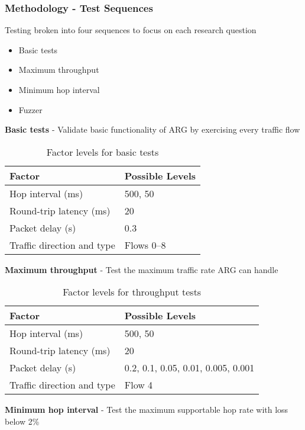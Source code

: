 \documentclass{beamer}
\begin{document}
\begin{frame}
	\frametitle{Methodology - Test Sequences}
	
	\begin{overprint}
		Testing broken into four sequences to focus on each research question
	
		\begin{itemize}
		\item Basic tests
		\item Maximum throughput
		\item Minimum hop interval
		\item Fuzzer
		\end{itemize}
	
		\textbf{Basic tests} - Validate basic functionality of ARG by exercising every traffic flow

		\begin{table}
		\caption{Factor levels for basic tests}
		\label{tbl:basic_factors}
		\centering
		\begin{tabular}{ll}
		\toprule
		\textbf{Factor} & \textbf{Possible Levels} \\
		\hline
		Hop interval (ms) & 500, 50\\
		Round-trip latency (ms) & 20\\
		Packet delay (s) & 0.3\\
		Traffic direction and type & Flows 0--8\\
		\bottomrule
		\end{tabular}
		\end{table}

		\textbf{Maximum throughput} - Test the maximum traffic rate ARG can handle

		\begin{table}
		\caption{Factor levels for throughput tests}
		\label{tbl:throughput_factors}
		\centering
		\begin{tabular}{ll}
		\toprule
		\textbf{Factor} & \textbf{Possible Levels} \\
		\hline
		Hop interval (ms) & 500, 50\\
		Round-trip latency (ms) & 20\\
		Packet delay (s) & 0.2, 0.1, 0.05, 0.01, 0.005, 0.001\\
		Traffic direction and type & Flow 4\\
		\bottomrule
		\end{tabular}
		\end{table}

		\textbf{Minimum hop interval} - Test the maximum supportable hop rate with loss below 2\%


\end{overprint}
\end{frame}
\end{document}

